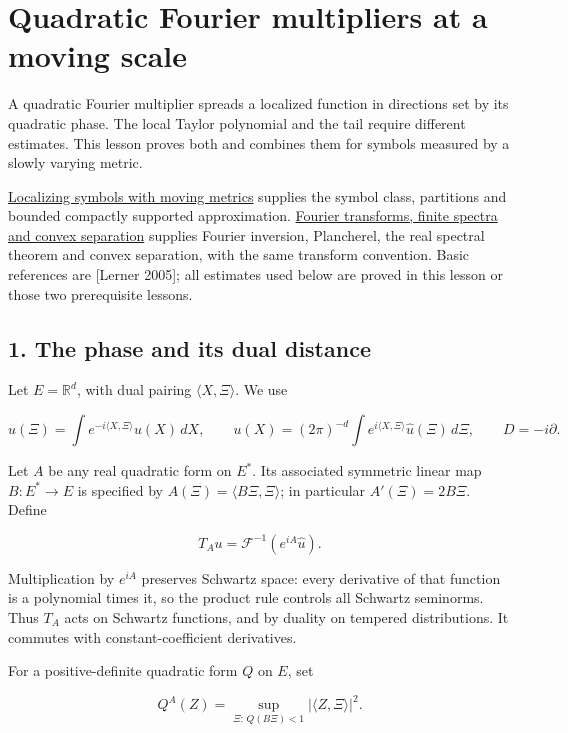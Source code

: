 \documentclass[
  11pt,
]{article}
\author{}
\date{}
\begin{document}
\section{Quadratic Fourier multipliers at a moving
scale}\label{quadratic-fourier-multipliers-at-a-moving-scale}

A quadratic Fourier multiplier spreads a localized function in
directions set by its quadratic phase. The local Taylor polynomial and
the tail require different estimates. This lesson proves both and
combines them for symbols measured by a slowly varying metric.

\href{metric-localization.pdf}{Localizing symbols with moving metrics}
supplies the symbol class, partitions and bounded compactly supported
approximation. \href{prerequisite-bridges.pdf}{Fourier transforms, finite
spectra and convex separation} supplies Fourier inversion, Plancherel,
the real spectral theorem and convex separation, with the same transform
convention. Basic references are {[}Lerner 2005{]}; all estimates used
below are proved in this lesson or those two prerequisite lessons.

\subsection{1. The phase and its dual
distance}\label{the-phase-and-its-dual-distance}

Let \(E=\mathbb R^d\), with dual pairing \(\langle X,\Xi\rangle\). We
use

\[
\widehat u(\Xi)=\int e^{-i\langle X,\Xi\rangle}u(X)\,dX,\qquad
u(X)=(2\pi)^{-d}\int e^{i\langle X,\Xi\rangle}\widehat u(\Xi)\,d\Xi,
\qquad D=-i\partial.
\]

Let \(A\) be any real quadratic form on \(E^*\). Its associated
symmetric linear map \(B:E^*\to E\) is specified by
\(A(\Xi)=\langle B\Xi,\Xi\rangle\); in particular \(A'(\Xi)=2B\Xi\).
Define

\[
T_Au=\mathcal F^{-1}(e^{iA}\widehat u).
\]

Multiplication by \(e^{iA}\) preserves Schwartz space: every derivative
of that function is a polynomial times it, so the product rule controls
all Schwartz seminorms. Thus \(T_A\) acts on Schwartz functions, and by
duality on tempered distributions. It commutes with constant-coefficient
derivatives.

For a positive-definite quadratic form \(Q\) on \(E\), set

\[
Q^A(Z)=\sup_{\Xi:\,Q(B\Xi)<1}|\langle Z,\Xi\rangle|^2.
                                                               \tag{G1}
\]
\end{document}
